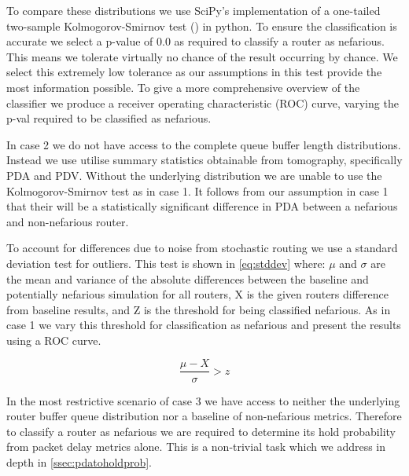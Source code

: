   To compare these distributions we use SciPy's implementation of a one-tailed two-sample Kolmogorov-Smirnov test (\cite{chakravarti_handbook_1967}) in python. To ensure the classification is accurate we select a p-value of 0.0 as required to classify a router as nefarious. This means we tolerate virtually no chance of the result occurring by chance. We select this extremely low tolerance as our assumptions in this test provide the most information possible. To give a more comprehensive overview of the classifier we produce a receiver operating characteristic (ROC) curve, varying the p-val required to be classified as nefarious.\par
  In case 2 we do not have access to the complete queue buffer length distributions. Instead we use utilise summary statistics obtainable from tomography, specifically PDA and PDV. Without the underlying distribution we are unable to use the Kolmogorov-Smirnov test as in case 1. It follows from our assumption in case 1 that their will be a statistically significant difference in PDA between a nefarious and non-nefarious router.\par
  To account for differences due to noise from stochastic routing we use a standard deviation test for outliers. This test is shown in \cref{eq:stddev} where: $\mu$ and $\sigma$ are the mean and variance of the absolute differences between the baseline and potentially nefarious simulation for all routers, X is the given routers difference from baseline results, and Z is the threshold for being classified nefarious. As in case 1 we vary this threshold for classification as nefarious and present the results using a ROC curve.\par
  
  \begin{equation}
  \label{eq:stddev}
      \frac{\mu-X}{\sigma}>z
  \end{equation}
  
  In the most restrictive scenario of case 3 we have access to neither the underlying router buffer queue distribution nor a baseline of non-nefarious metrics. Therefore to classify a router as nefarious we are required to determine its hold probability from packet delay metrics alone. This is a non-trivial task which we address in depth in \cref{ssec:pdatoholdprob}.\par
  
